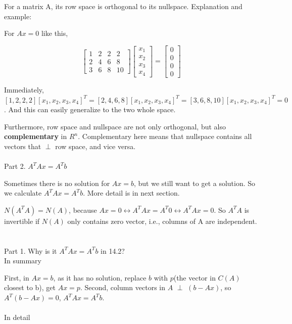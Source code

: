 \documentclass{article}
\begin{document}
\begin{spacing}{1.5}
For a matrix A, its row space is orthogonal to its nullspace. Explanation and example:

For $Ax=0$ like this,

$$
\begin{bmatrix}
1 & 2 & 2 & 2 \\
2 & 4 & 6 & 8 \\ 
3 & 6 & 8 & 10 
\end{bmatrix}
\begin{bmatrix}
x_1 \\
x_2 \\
x_3 \\
x_4
\end{bmatrix}
=
\begin{bmatrix}
0 \\
0 \\
0 \\
0 
\end{bmatrix}
$$

Immediately, $[1, 2, 2, 2] [x_1, x_2, x_3, x_4]^T = [2, 4, 6, 8][x_1, x_2, x_3, x_4]^T = [3, 6, 8, 10] [x_1, x_2, x_3, x_4]^T = 0$. And this can easily generalize to the two whole space.

Furthermore,  row space and nullspace are not only orthogonal, but also {\bfseries complementary} in $R^n$. Complementary here means that nullspace contains all vectors that $\perp$ row space, and vice versa.
\\\\Part 2. $A^TAx=A^Tb$

Sometimes there is no solution for $Ax=b$, but we still want to get a solution. So we calculate $A^TAx=A^Tb$. More detail is in next section.

$N(A^TA)=N(A)$, because $Ax=0 \leftrightarrow A^TAx=A^T0 \leftrightarrow A^TAx=0$.
So $A^TA$ is invertible if $N(A)$ only contains zero vector, i.e., columns of A are independent.


\section{}
Part 1. Why is it $A^TAx=A^Tb$ in 14.2? \\
In summary

First, in $Ax=b$, as it has no solution, replace $b$ with $p$(the vector in $C(A)$ closest to b), get $Ax=p$. Second, column vectors in $A$ $\perp$ $(b-Ax)$, so $A^T(b-Ax)=0$, $A^TAx=A^Tb$.
\\\\In detail


\end{spacing}
\end{document}
